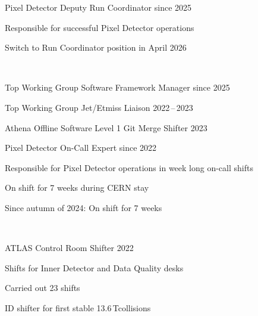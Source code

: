 \begin{cvhonors}
    \cvhonor
        {Pixel Detector} %
        {Deputy Run Coordinator} %
        {} %
        {since 2025} %
        {%
            \begin{cvitems}%
                \item {Responsible for successful Pixel Detector operations}
                \item {Switch to Run Coordinator position in April 2026}
            \end{cvitems}%
        ~%
    } %

    \cvhonor
        {Top Working Group}
        {Software Framework Manager}
        {} %
        {since 2025} %
        {%
        }

    \cvhonor
        {Top Working Group} %
        {Jet/Etmiss Liaison} %
        {} %
        {2022\,--\,2023} %
        {}

    \cvhonor
        {Athena Offline Software} %
        {Level 1 Git Merge Shifter} %
        {} %
        {2023} %
        {}

    \cvhonor
        {Pixel Detector} %
        {On-Call Expert} %
        {} %
        {since 2022} %
        {%
            \begin{cvitems}%
                \item {Responsible for Pixel Detector operations in week long on-call shifts}
                \item {On shift for 7 weeks during CERN stay}%
                \item {Since autumn of 2024: On shift for 7 weeks}%
            \end{cvitems}%
            ~%
        }
    \cvhonor
        {ATLAS Control Room} %
        {Shifter} %
        {} %
        {2022} %
        {%
            \begin{cvitems}%
                \item {Shifts for Inner Detector and Data Quality desks}
                \item {Carried out 23 shifts}%
                \item {ID shifter for first stable 13.6\,T\evolt collisions}%
            \end{cvitems}%
            ~%
        }


\end{cvhonors}
